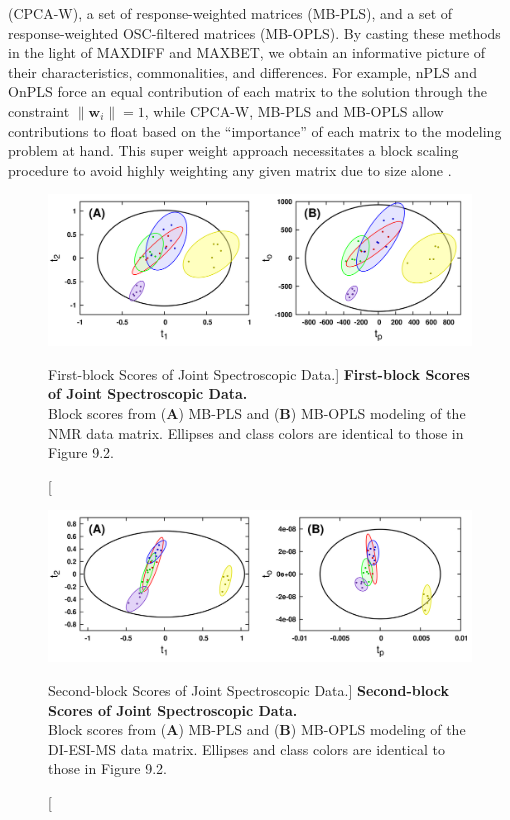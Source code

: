 \begin{doublespace}
(CPCA-W), a set of response-weighted matrices (MB-PLS), and a set of
response-weighted OSC-filtered matrices (MB-OPLS). By casting these methods
in the light of MAXDIFF and MAXBET, we obtain an informative picture of their
characteristics, commonalities, and differences. For example, nPLS and OnPLS
force an equal contribution of each matrix to the solution through the
constraint $\|\mathbf{w}_i\|=1$, while CPCA-W, MB-PLS and MB-OPLS allow
contributions to float based on the ``importance'' of each matrix to the
modeling problem at hand. This super weight approach necessitates a block
scaling procedure to avoid highly weighting any given matrix due to size
alone \cite{smilde:jchemo2003,westerhuis:jchemo1998}.
\end{doublespace}

\begin{figure}[ht!]
\includegraphics[width=6in]{figs/mbopls/04-blkscores-1.png}
\caption
      [First-block Scores of Joint Spectroscopic Data.]{
  {\bf First-block Scores of Joint Spectroscopic Data.}
  \\
  Block scores from ({\bf A}) MB-PLS and ({\bf B}) MB-OPLS modeling of the
  \hnmr{} NMR data matrix. Ellipses and class colors are identical to those
  in Figure 9.2.
}
\label{figure.9.4}
\end{figure}

\begin{figure}[ht!]
\includegraphics[width=6in]{figs/mbopls/05-blkscores-2.png}
\caption
      [Second-block Scores of Joint Spectroscopic Data.]{
  {\bf Second-block Scores of Joint Spectroscopic Data.}
  \\
  Block scores from ({\bf A}) MB-PLS and ({\bf B}) MB-OPLS modeling of the
  DI-ESI-MS data matrix. Ellipses and class colors are identical to those
  in Figure 9.2.
}
\label{figure.9.5}
\end{figure}

